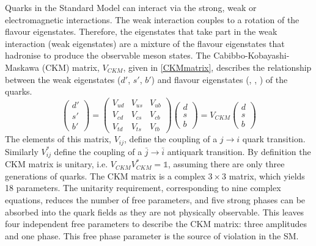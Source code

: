 Quarks in the Standard Model can interact via the strong, weak or electromagnetic interactions. The weak interaction couples to a rotation of the flavour eigenstates.
Therefore, the eigenstates that take part in the weak interaction (weak eigenstates) are a mixture of the flavour eigenstates that hadronise to produce the observable meson states. The Cabibbo-Kobayashi-Maskawa (CKM) matrix, $V_{CKM}$, given in \eqn \ref{CKMmatrix}, describes the relationship between the weak eigenstates ($d'$, $s'$, $b'$) and flavour eigenstates (\dquark, \squark, \bquark) of the quarks. 
\begin{equation}
\left(
\begin{array}{c} d' \\ s' \\ b'  \end{array} \right) =
\begin{pmatrix} V_{ud} & V_{us} & V_{ub} \\ V_{cd} & V_{cs} & V_{cb} \\ V_{td} & V_{ts} & V_{tb} \end{pmatrix} \left( 
\begin{array}{c} d \\ s \\ b \end{array} \right) =
V_{CKM} \left( \begin{array}{c} d \\ s \\ b \end{array} \right)
\label{CKMmatrix}
\end{equation}
The elements of this matrix, $V_{ij}$, define the coupling of a $j \to i$ quark transition. Similarly $V_{ij}^*$ define the coupling of a $\bar{j} \to \bar{i}$ antiquark transition. By definition the CKM matrix is unitary, i.e. $V_{CKM}V_{CKM}^* = \mathds{1}$, assuming there are only three generations of quarks. The CKM matrix is a complex $3 \times 3$ matrix, which yields 18 parameters. The unitarity requirement, corresponding to nine complex equations, reduces the number of free parameters, and five strong phases can be absorbed into the quark fields as they are not physically observable. This leaves four independent free parameters to describe the CKM matrix: three amplitudes and one phase. This free phase parameter is the source of \CP violation in the SM. 

